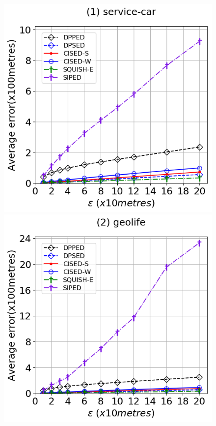 {\begin{figure}[tb!]
\centering
\includegraphics[scale = 0.290]{Figures/Exp-query-ae-epsilon-service.png}\hspace{1ex}
\includegraphics[scale = 0.290]{Figures/Exp-query-ae-epsilon-geolife.png}\hspace{1ex}

\end{figure}}
